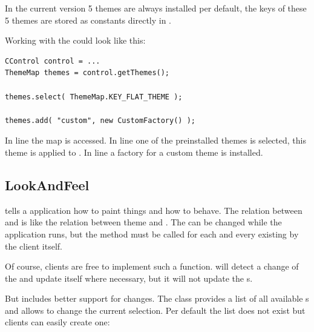In the current version 5 themes are always installed per default, the keys of these 5 themes are stored as constants directly in .

Working with the  could look like this:
\begin{lstlisting}
CControl control = ...
ThemeMap themes = control.getThemes();

themes.select( ThemeMap.KEY_FLAT_THEME );

themes.add( "custom", new CustomFactory() );
\end{lstlisting}
In line  the map is accessed. In line  one of the preinstalled themes is selected, this theme is applied to . In line  a factory for a custom theme is installed.


\subsection{LookAndFeel} \label{sec:lookandfeel}
 tells a  application how to paint things and how to behave. The relation between  and  is like the relation between theme and . The  can be changed while the application runs, but the method  must be called for each and every existing  by the client itself.

Of course, clients are free to implement such a function.  will detect a change of the  and update itself where necessary, but it will not update the s.

But  includes better support for  changes. The class  provides a list of all available s and allows to change the current selection. Per default the list does not exist but clients can easily create one:

